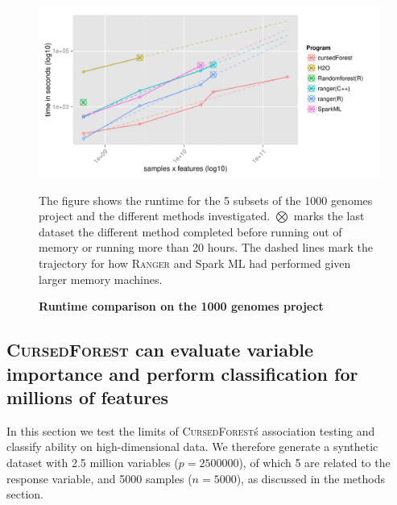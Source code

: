 \documentclass[10pt,letterpaper]{article}
\newcommand{\cursedforest}{\textsc{CursedForest}\xspace}
\newcommand{\ranger}{\textsc{Ranger}\xspace}
\begin{document}
\begin{figure}[tbhp]
  \begin{adjustwidth}{-1.00in}{0in}
    \caption{\textbf{Runtime comparison on the 1000 genomes project}}
    \label{figure:1000genomes}
    \includegraphics[totalheight=8cm]{./figs/1000genomesRuntime.pdf}
    \begin{flushleft}
      The figure shows the runtime for the 5 subsets of the 1000 genomes project and the different methods investigated.
      $\bigotimes$ marks the last dataset the different method completed before running out of memory or running more than
      20 hours. The dashed lines mark the trajectory for how \ranger and Spark ML had performed given larger memory machines.
    \end{flushleft}
  \end{adjustwidth}
\end{figure}




\subsection{\cursedforest can evaluate variable importance and perform classification for millions of features}
In this section we test the limits of \cursedforest\'s association testing and classify ability on high-dimensional data. 
We therefore generate a synthetic dataset with 2.5 million variables ($p=2500000$), of which 5 
are related to the response variable, and 5000 samples ($n=5000$), as discussed in the methods section.
\end{document}
